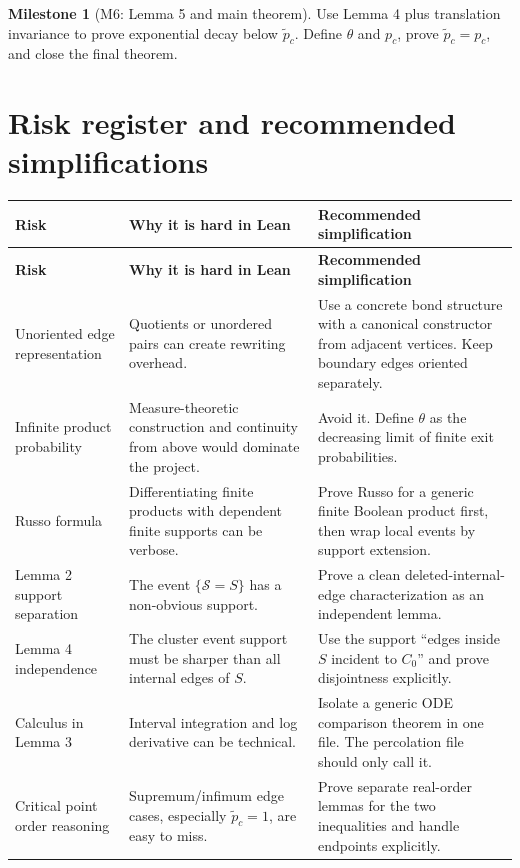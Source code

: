 \documentclass[11pt]{article}
\newcommand{\pcrit}{p_c}
\newcommand{\ptilde}{\widetilde p_c}
\theoremstyle{definition}
\newtheorem{milestone}[definition]{Milestone}
\theoremstyle{plain}
\begin{document}
\begin{milestone}[M6: Lemma 5 and main theorem]
Use Lemma 4 plus translation invariance to prove exponential decay below $\ptilde$.  Define $\theta$ and $\pcrit$, prove $\ptilde=\pcrit$, and close the final theorem.
\end{milestone}

\section{Risk register and recommended simplifications}

\begin{longtable}{p{}p{}p{}}
\toprule
\textbf{Risk} & \textbf{Why it is hard in Lean} & \textbf{Recommended simplification}\\
\midrule
\endfirsthead
\toprule
\textbf{Risk} & \textbf{Why it is hard in Lean} & \textbf{Recommended simplification}\\
\midrule
\endhead
Unoriented edge representation
& Quotients or unordered pairs can create rewriting overhead.
& Use a concrete bond structure with a canonical constructor from adjacent vertices.  Keep boundary edges oriented separately.\\
\addlinespace
Infinite product probability
& Measure-theoretic construction and continuity from above would dominate the project.
& Avoid it.  Define $\theta$ as the decreasing limit of finite exit probabilities.\\
\addlinespace
Russo formula
& Differentiating finite products with dependent finite supports can be verbose.
& Prove Russo for a generic finite Boolean product first, then wrap local events by support extension.\\
\addlinespace
Lemma 2 support separation
& The event $\{\mathcal S=S\}$ has a non-obvious support.
& Prove a clean deleted-internal-edge characterization as an independent lemma.\\
\addlinespace
Lemma 4 independence
& The cluster event support must be sharper than all internal edges of $S$.
& Use the support ``edges inside $S$ incident to $C_0$'' and prove disjointness explicitly.\\
\addlinespace
Calculus in Lemma 3
& Interval integration and log derivative can be technical.
& Isolate a generic ODE comparison theorem in one file.  The percolation file should only call it.\\
\addlinespace
Critical point order reasoning
& Supremum/infimum edge cases, especially $\ptilde=1$, are easy to miss.
& Prove separate real-order lemmas for the two inequalities and handle endpoints explicitly.\\
\bottomrule
\end{longtable}
\end{document}
